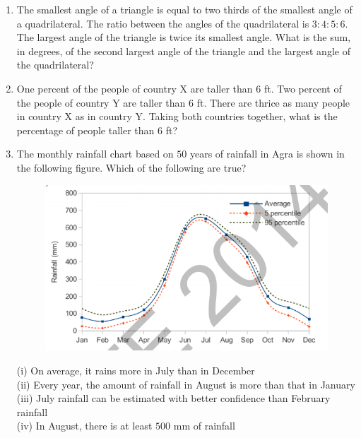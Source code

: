 \documentclass[a4paper,10pt]{article}
\begin{document}
\begin{enumerate}
    \item The smallest angle of a triangle is equal to two thirds of the smallest angle of a quadrilateral. The ratio between the angles of the quadrilateral is $3:4:5:6$. The largest angle of the triangle is twice its smallest angle. What is the sum, in degrees, of the second largest angle of the triangle and the largest angle of the quadrilateral?
    
    \hfill{}

    \item One percent of the people of country X are taller than $6$ ft. Two percent of the people of country Y are taller than $6$ ft. There are thrice as many people in country X as in country Y. Taking both countries together, what is the percentage of people taller than $6$ ft?
    
    \hfill{}
    \begin{enumerate}[label=\Alph*)]
    \end{enumerate}

    \item The monthly rainfall chart based on $50$ years of rainfall in Agra is shown in the following figure. Which of the following are true? 
    \begin{figure}[H]
        \centering 
        \includegraphics[width=0.7\columnwidth]{GAq10.png} \caption*{} 
        \label{fig:q10} 
    \end{figure}
    (i) On average, it rains more in July than in December \\
    (ii) Every year, the amount of rainfall in August is more than that in January \\
    (iii) July rainfall can be estimated with better confidence than February rainfall \\
    (iv) In August, there is at least $500$ mm of rainfall
    

\end{enumerate}
\end{document}
